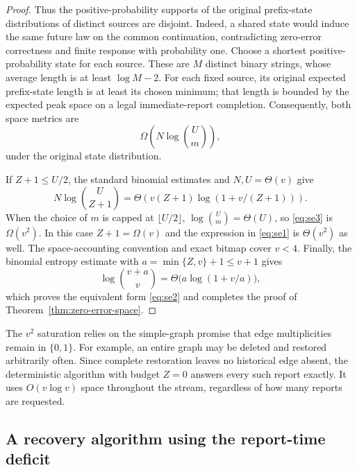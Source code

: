 \documentclass[11pt,letterpaper]{article}
\numberwithin{equation}{section}
\begin{document}
\begin{proof}
Thus the positive-probability supports of the original prefix-state distributions of distinct sources are disjoint.
Indeed, a shared state would induce the same future law on the common continuation, contradicting zero-error correctness and finite response with probability one.
Choose a shortest positive-probability state for each source.
These are $M$ distinct binary strings, whose average length is at least $\log M-2$.
For each fixed source, its original expected prefix-state length is at least its chosen minimum; that length is bounded by the expected peak space on a legal immediate-report completion.
Consequently, both space metrics are
\begin{equation}
\Omega\!\left(N\log\binom{U}{m}\right),
 \label{eq:se3}
\end{equation}
under the original state distribution.

If $Z+1\le U/2$, the standard binomial estimates and $N,U=\Theta(v)$ give
\[
 N\log\binom{U}{Z+1}
 =\Theta\!\left(v(Z+1)\log(1+v/(Z+1))\right).
\]
When the choice of $m$ is capped at $\lfloor U/2\rfloor$, $\log\binom{U}{m}=\Theta(U)$, so \eqref{eq:se3} is $\Omega(v^2)$.
In this case $Z+1=\Omega(v)$ and the expression in \eqref{eq:se1} is $\Theta(v^2)$ as well.
The space-accounting convention and exact bitmap cover $v<4$.
Finally, the binomial entropy estimate with $a=\min\{Z,v\}+1\le v+1$ gives
\[
 \log\binom{v+a}{v}
 =\Theta\bigl(a\log(1+v/a)\bigr),
\]
which proves the equivalent form \eqref{eq:se2} and completes the proof of Theorem~\ref{thm:zero-error-space}.
\end{proof}

The $v^2$ saturation relies on the simple-graph promise that edge multiplicities remain in $\{0,1\}$.
For example, an entire graph may be deleted and restored arbitrarily often.
Since complete restoration leaves no historical edge absent, the deterministic algorithm with budget $Z=0$ answers every such report exactly.
It uses $O(v\log v)$ space throughout the stream, regardless of how many reports are requested.

\subsection{A recovery algorithm using the report-time deficit}
\label{sec:forest-budget-sensitive-banks}
\end{document}
